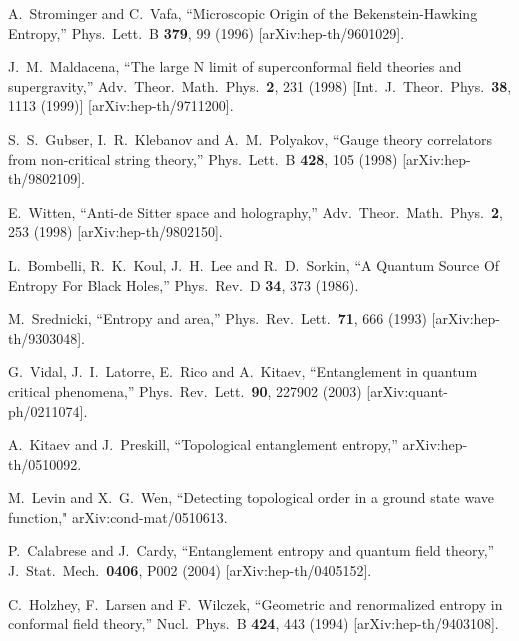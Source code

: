 \documentclass[twocolumn,amsmath,amssymb,nofootinbib,eqsecnum,tighten,prd]{revtex4}
\begin{document}
\begin{thebibliography}{99}


  A.~Strominger and C.~Vafa,
  ``Microscopic Origin of the Bekenstein-Hawking Entropy,''
  Phys.\ Lett.\ B {\bf 379}, 99 (1996)
  [arXiv:hep-th/9601029].


 J.~M.~Maldacena,
  ``The large N limit of superconformal field theories and supergravity,''
  Adv.\ Theor.\ Math.\ Phys.\  {\bf 2}, 231 (1998)
  [Int.\ J.\ Theor.\ Phys.\  {\bf 38}, 1113 (1999)]
  [arXiv:hep-th/9711200].

S.~S.~Gubser, I.~R.~Klebanov and A.~M.~Polyakov,
  ``Gauge theory correlators from non-critical string theory,''
  Phys.\ Lett.\ B {\bf 428}, 105 (1998)
  [arXiv:hep-th/9802109].

E.~Witten,
  ``Anti-de Sitter space and holography,''
  Adv.\ Theor.\ Math.\ Phys.\  {\bf 2}, 253 (1998)
  [arXiv:hep-th/9802150].

 L.~Bombelli, R.~K.~Koul, J.~H.~Lee and R.~D.~Sorkin,
 ``A Quantum Source Of Entropy For Black Holes,''  Phys.\
 Rev.\ D {\bf 34}, 373 (1986).

 M.~Srednicki,
  ``Entropy and area,''
  Phys.\ Rev.\ Lett.\  {\bf 71}, 666 (1993)
  [arXiv:hep-th/9303048].
  
 G.~Vidal, J.~I.~Latorre, E.~Rico and A.~Kitaev,
 ``Entanglement in quantum critical phenomena,''
 Phys.\ Rev.\ Lett.\  {\bf 90}, 227902 (2003)
 [arXiv:quant-ph/0211074].
  
 
 A.~Kitaev and J.~Preskill,
  ``Topological entanglement entropy,''
  arXiv:hep-th/0510092.

M.\ Levin and X.\ G.\ Wen,
``Detecting topological order in a ground state wave function,"
arXiv:cond-mat/0510613.

P.~Calabrese and J.~Cardy,
  ``Entanglement entropy and quantum field theory,''
  J.\ Stat.\ Mech.\  {\bf 0406}, P002 (2004)
  [arXiv:hep-th/0405152].


C.~Holzhey, F.~Larsen and F.~Wilczek,
  ``Geometric and renormalized entropy in conformal field theory,''
  Nucl.\ Phys.\ B {\bf 424}, 443 (1994)
  [arXiv:hep-th/9403108].


\end{thebibliography}
\end{document}
